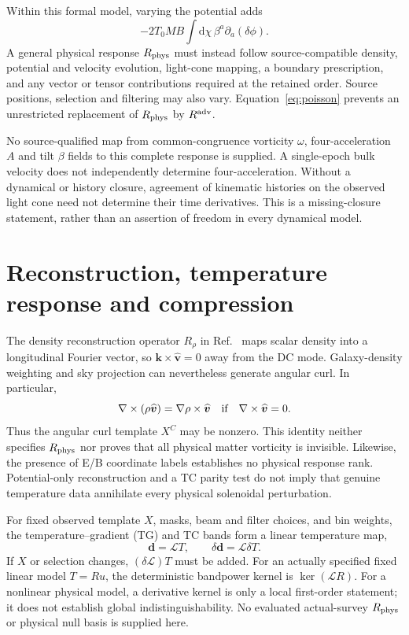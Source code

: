 \documentclass[aps,prd,reprint,onecolumn,notitlepage,nofootinbib]{revtex4-2}
\newcommand{\dd}{\mathrm d}
\newcommand{\vect}[1]{\boldsymbol{#1}}
\begin{document}
Within this formal model, varying the potential adds
\begin{equation}
 -2T_0MB\int\dd\chi\,\beta^a\partial_a(\delta\phi).
\end{equation}
A general physical response $R_{\rm phys}$ must instead follow source-compatible density, potential and velocity evolution, light-cone mapping, a boundary prescription, and any vector or tensor contributions required at the retained order. Source positions, selection and filtering may also vary. Equation~\eqref{eq:poisson} prevents an unrestricted replacement of $R_{\rm phys}$ by $R^{\rm adv}$.

No source-qualified map from common-congruence vorticity $\omega$, four-acceleration $A$ and tilt $\beta$ fields to this complete response is supplied. A single-epoch bulk velocity does not independently determine four-acceleration. Without a dynamical or history closure, agreement of kinematic histories on the observed light cone need not determine their time derivatives. This is a missing-closure statement, rather than an assertion of freedom in every dynamical model.

\section{Reconstruction, temperature response and compression}

The density reconstruction operator $R_\rho$ in Ref.~\cite{actdesi} maps scalar density into a longitudinal Fourier vector, so $\vect k\times\widehat{\vect v}=0$ away from the DC mode. Galaxy-density weighting and sky projection can nevertheless generate angular curl. In particular,
\begin{equation}
 \nabla\times(\rho\widehat{\vect v})=
 \nabla\rho\times\widehat{\vect v}
 \quad\hbox{if}\quad\nabla\times\widehat{\vect v}=0.
\end{equation}
Thus the angular curl template $X^C$ may be nonzero. This identity neither specifies $R_{\rm phys}$ nor proves that all physical matter vorticity is invisible. Likewise, the presence of E/B coordinate labels establishes no physical response rank. Potential-only reconstruction and a TC parity test do not imply that genuine temperature data annihilate every physical solenoidal perturbation.

For fixed observed template $X$, masks, beam and filter choices, and bin weights, the temperature--gradient (TG) and TC bands form a linear temperature map,
\begin{equation}
 \vect d=\mathcal LT,\qquad
 \delta\vect d=\mathcal L\delta T.
\end{equation}
If $X$ or selection changes, $(\delta\mathcal L)T$ must be added. For an actually specified fixed linear model $T=Ru$, the deterministic bandpower kernel is $\ker(\mathcal LR)$. For a nonlinear physical model, a derivative kernel is only a local first-order statement; it does not establish global indistinguishability. No evaluated actual-survey $R_{\rm phys}$ or physical null basis is supplied here.
\end{document}
